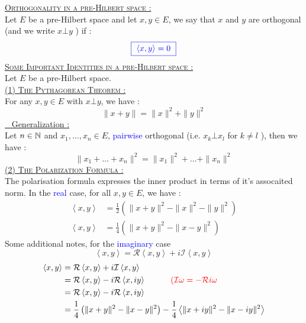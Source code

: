 \textsc{\large \underline{Orthogonality in a pre-Hilbert space : \warning }} \\
Let $E $ be a pre-Hilbert space and let $x,y \in  E $, we say 
that $x $ and $y $ are orthogonal (and we write $x \bot y $ ) if :
\[
  \textcolor{blue}{
  \fbox{
    $ \left\langle x,y \right\rangle = 0$
  }
  }
\]
\textsc{\large \underline{Some Important Identities in a pre-Hilbert space : \warning }}\\
Let $E $ be a pre-Hilbert space. 
\\
\textsc{\underline{(1) The Pythagorean Theorem : \lefthand }} \\
For any $x,y \in  E $  with $x \bot y $, we have :
\[
\| x + y \| = \| x \| ^2  + \| y \| ^2 
\]
\underline{\lefthand~ Generalization : } \\
Let $n \in  \mathbb{N} $ and $x_1, \hdots , x_n  \in  E $, \textcolor{blue}{pairwise} orthogonal 
(i.e. $x_{k} \bot x_{l} $ for $k \neq l $ ), then we have :  
\[
\| x_1 + \hdots + x_n  \| ^2  = 
\| x_1 \| ^2 + \hdots + \| x_n  \| ^2 
\]
\textsc{\underline{(2) The Polarization Formula : \lefthand }} \\
The polarisation formula expresses the inner product in terms of it's
assocaited norm. In the \textcolor{blue}{real} case, for all $x,y \in  E $, we have :
\begin{align*}
  \left\langle x,y \right\rangle &= \frac{1}{2}
\left( \| x+y \| ^2  - \| x \| ^2  - \| y \| ^2  \right) \\
  \left\langle x,y \right\rangle  &= \frac{1}{4}
  \left( \| x+y \| ^2  - \| x-y \| ^2  \right)
\end{align*}
Some additional notes, for the \textcolor{blue}{imaginary} case
\[
  \left\langle x,y \right\rangle  = \mathcal{R} \left\langle x,y \right\rangle + 
  i \mathcal{I} \left\langle x,y \right\rangle 
\]
\begin{align*}
  \left\langle x,y \right\rangle &= 
  \mathcal{R} \left\langle x,y \right\rangle + 
  i \mathcal{I} \left\langle x,y \right\rangle \\
                                 &= \mathcal{R} 
                                 \left\langle x,y \right\rangle - 
                                 i \mathcal{R} \left\langle x, iy\right\rangle   \quad 
                                 \quad \quad 
                                   \textcolor{red}{(\mathcal{I} \omega  = - \mathcal{R} i\omega }
                                 \\
                                 &= \mathcal{R} \left\langle x,y \right\rangle - 
                                 i \mathcal{R} \left\langle x, iy \right\rangle  \\
                                 &= 
                                 \frac{1}{4}
                                 \left( 
                                   \| x+y \| ^2  - 
                                   \| x-y \| ^2 
                                 \right) - 
                                 \frac{1}{4}
                                 \left\langle \| x+iy \| ^2 - 
                                 \| x - iy \| ^2 \right\rangle 
\end{align*}
